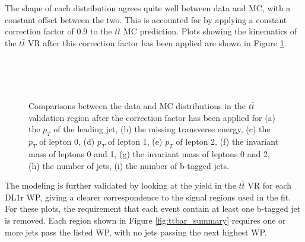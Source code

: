 The shape of each distribution agrees quite well between data and MC, with a constant offset between the two. This is accounted for by applying a constant correction factor of 0.9 to the $t\bar{t}$ MC prediction. Plots showing the kinematics of the $t\bar{t}$ VR after this correction factor has been applied are shown in Figure \ref{fig:ttbar_withScale}.

\begin{figure}[H] 
    \centering
    \\                                     
    \\                                        
    \\                             
    \caption{Comparisons between the data and MC distributions in the $t\bar{t}$ validation region after the correction factor has been applied for (a) the $p_T$ of the leading jet, (b) the missing transverse energy, (c) the $p_T$ of lepton 0, (d) $p_T$ of lepton 1, (e) $p_T$ of lepton 2, (f) the invariant mass of leptons 0 and 1, (g) the invariant mass of leptons 0 and 2, (h) the number of jets, (i) the number of b-tagged jets.}                                                                   
     \label{fig:ttbar_withScale}
\end{figure}

The modeling is further validated by looking at the yield in the $t\bar{t}$ VR for each DL1r WP, giving a clearer correspondence to the signal regions used in the fit. For these plots, the requirement that each event contain at least one b-tagged jet is removed. Each region shown in Figure \ref{fig:ttbar_summary} requires one or more jets pass the listed WP, with no jets passing the next highest WP.

